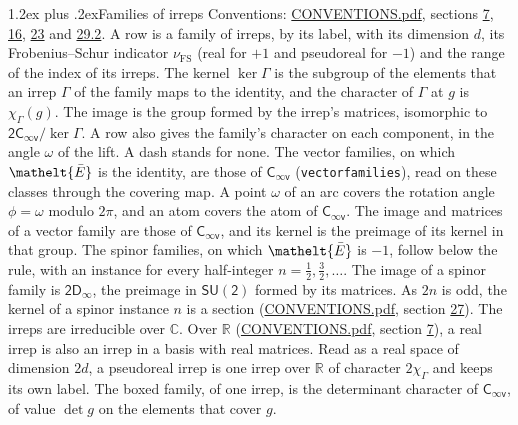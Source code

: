\documentclass[10pt,a4paper]{article}
\makeatletter
\renewcommand\section{\@startsection{section}{1}{\z@}{-3ex plus -1ex minus -.2ex}%
  {1.2ex plus .2ex}{\normalfont\large\sffamily\bfseries\color{parttitle}}}
\numberwithin{equation}{section}
\newcommand{\eltfont}[1]{{\let\sigma\eltsigma\mathelt{#1}}}
\newcommand{\grp}[1]{\mathsf{#1}}
\newcommand{\elt}[1]{\eltfont{#1}}
\newcommand{\irchar}[1]{\chi_{#1}}
\newcommand{\fsind}{\nu_{\mathrm{FS}}}
\newcommand{\barred}[1]{\bar{#1}}
\makeatother
\begin{document}
\section{Families of irreps}\label{s:families}
Conventions: \href{../../CONVENTIONS.pdf}{CONVENTIONS.pdf}, sections \href{../../../rotation/CONVENTIONS.pdf\#conv.7}{7}, \href{../../../rotation/CONVENTIONS.pdf\#conv.16}{16}, \href{../../CONVENTIONS.pdf\#conv.23}{23} and \href{../../CONVENTIONS.pdf\#conv.29.2}{29.2}.
\leavevmode\label{n:head.family.irreps}\label{n:index.dimension}\label{n:index.frobenius}\label{n:head.index.family}A row is a family of irreps, by its label, with its dimension $d$, its Frobenius--Schur indicator $\fsind$ (real for $+1$ and pseudoreal for $-1$) and the range of the index of its irreps. \label{n:head.kernel}\label{n:function.character}The kernel $\ker\Gamma$ is the subgroup of the elements that an irrep $\Gamma$ of the family maps to the identity, and the character of $\Gamma$ at $g$ is $\irchar{\Gamma}(g)$. \label{n:head.image}The image is the group formed by the irrep's matrices, isomorphic to $\grp{2C_{\infty v}}/\ker\Gamma$. A row also gives the family's character on each component, in the angle $\omega$ of the lift. A dash stands for none. The vector families, on which $\elt{\barred{E}}$ is the identity, are those of \href{../../../rotation/data/pdf/Cinfv.pdf}{$\grp{C_{\infty v}}$} (\texttt{vectorfamilies}), read on these classes through the covering map. A point $\omega$ of an arc covers the rotation angle $\phi = \omega$ modulo $2\pi$, and an atom covers the atom of \href{../../../rotation/data/pdf/Cinfv.pdf}{$\grp{C_{\infty v}}$}. The image and matrices of a vector family are those of \href{../../../rotation/data/pdf/Cinfv.pdf}{$\grp{C_{\infty v}}$}, and its kernel is the preimage of its kernel in that group. The spinor families, on which $\elt{\barred{E}}$ is $-1$, follow below the rule, with an instance for every half-integer $n = \tfrac{1}{2}, \tfrac{3}{2}, \dots$. The image of a spinor family is \href{2Dinf.pdf}{$\grp{2D_{\infty }}$}, the preimage in $\grp{SU(2)}$ formed by its matrices. As $2n$ is odd, the kernel of a spinor instance $n$ is a section (\href{../../CONVENTIONS.pdf}{CONVENTIONS.pdf}, section \href{../../CONVENTIONS.pdf\#conv.27}{27}). The irreps are irreducible over $\mathbb{C}$. Over $\mathbb{R}$ (\href{../../CONVENTIONS.pdf}{CONVENTIONS.pdf}, section \href{../../../rotation/CONVENTIONS.pdf\#conv.7}{7}), a real irrep is also an irrep in a basis with real matrices. Read as a real space of dimension $2d$, a pseudoreal irrep is one irrep over $\mathbb{R}$ of character $2\irchar{\Gamma}$ and keeps its own label. \label{n:mark.determinant}The boxed family, of one irrep, is the determinant character of \href{../../../rotation/data/pdf/Cinfv.pdf}{$\grp{C_{\infty v}}$}, of value $\det g$ on the elements that cover $g$.
\end{document}
